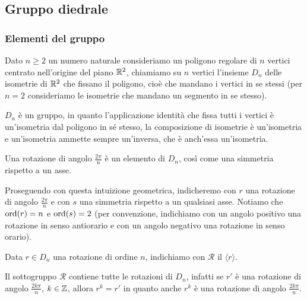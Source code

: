 \documentclass[11pt]{scrartcl}
\begin{document}
\newpage

\subsection{Gruppo diedrale}

\subsubsection{Elementi del gruppo}

\begin{definition}
    Dato $n \geqslant 2$ un numero naturale consideriamo un poligono regolare di $n$ vertici
    centrato nell'origine del piano $\mathbb R^2$,
    chiamiamo  su $n$ vertici l'insieme $D_n$
    delle isometrie di $\mathbb R^2$ che fissano il poligono, cioè che mandano i 
    vertici in se stessi (per $n = 2$ consideriamo le isometrie che mandano un 
    segmento in se stesso).
\end{definition}

\begin{remark}
    $D_n$ è un gruppo, in quanto l'applicazione identità che 
    fissa tutti i vertici è un'isometria dal poligono in sé stesso, la 
    composizione di isometrie è un'isometria e un'isometria ammette sempre 
    un'inversa, che è anch'essa un'isometria.
\end{remark}

\begin{remark}
    Una rotazione di angolo $\displaystyle\frac{2\pi}{n}$ è un elemento di $D_n$,
    così come una simmetria rispetto a un asse.
\end{remark}

Proseguendo con questa intuizione geometrica, indicheremo con $r$ una rotazione
di angolo $\displaystyle \frac{2\pi}{n}$ e con $s$ una simmetria rispetto a
un qualsiasi asse. Notiamo che $\operatorname{ord}(r) = n$ e $\operatorname{ord}(s) = 2$ (per convenzione, 
indichiamo con un angolo positivo una rotazione in senso antiorario e con un 
angolo negativo una rotazione in senso orario).

\begin{definition}
    Data $r \in D_n$ una rotazione di ordine $n$, indichiamo con $\mathcal{R}$ il
     $\langle r\rangle$.
\end{definition}

\begin{remark}
    Il sottogruppo $\mathcal{R}$ contiene tutte le rotazioni di $D_n$, infatti
    se $r'$ è una rotazione di angolo $\displaystyle\frac{2k\pi}{n}$, $k \in \mathbb Z$,
    allora $r^k = r'$ in quanto anche $r^k$ è una rotazione di angolo 
    $\displaystyle\frac{2k\pi}{n}$.
\end{remark}
\end{document}
